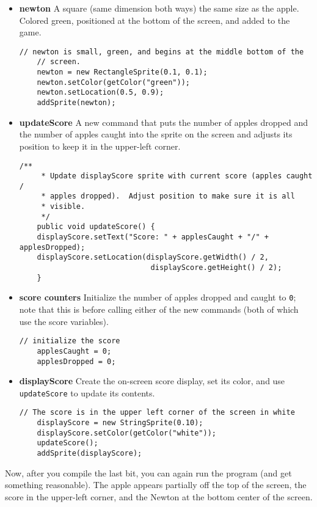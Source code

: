 \documentclass[12pt,twoside]{memoir}
\newcommand\code[1]{\lstinline^#1^}
\newenvironment{LabExercises}{%
\renewcommand{\ExerciseListName}{Question}%
\renewcommand{\ExerciseListHeader}{\textbf{%
   Checkpoint\ExerciseHeaderNB. }}
\begin{ExerciseList}}%
{\end{ExerciseList}}
\begin{document}
\begin{LabExercises}
\begin{itemize}
\item \textbf{newton} A square (same dimension both ways) the same
  size as the apple. Colored green, positioned at the bottom of the
  screen, and added to the game.
\begin{lstlisting}[numbers=none]    
	// newton is small, green, and begins at the middle bottom of the
	// screen.
	newton = new RectangleSprite(0.1, 0.1);
	newton.setColor(getColor("green"));
	newton.setLocation(0.5, 0.9);
	addSprite(newton);
\end{lstlisting}

\item \textbf{updateScore} A new command that puts the number of
  apples dropped and the number of apples caught into the sprite on
  the screen and adjusts its position to keep it in the upper-left corner.
\begin{lstlisting}[numbers=none]    
    /**
     * Update displayScore sprite with current score (apples caught /
     * apples dropped).  Adjust position to make sure it is all
     * visible.
     */
    public void updateScore() {
	displayScore.setText("Score: " + applesCaught + "/" + applesDropped);
	displayScore.setLocation(displayScore.getWidth() / 2, 
				              displayScore.getHeight() / 2);
    }
\end{lstlisting}

\item \textbf{score counters} Initialize the number of apples dropped
  and caught to \code{0}; note that this is before calling either of
  the new commands (both of which use the score variables).
\begin{lstlisting}[numbers=none]    
	// initialize the score
	applesCaught = 0;
	applesDropped = 0;
\end{lstlisting}

\item \textbf{displayScore} Create the on-screen score display,
  set its color, and use \code{updateScore} to update its contents.
\begin{lstlisting}[numbers=none]    
	// The score is in the upper left corner of the screen in white
	displayScore = new StringSprite(0.10);
	displayScore.setColor(getColor("white"));
	updateScore(); 
	addSprite(displayScore);
\end{lstlisting}
\end{itemize}

Now, after you compile the last bit, you can again run the program
(and get something reasonable). The apple appears partially off the
top of the screen, the score in the upper-left corner, and the Newton
at the bottom center of the screen. 


\end{LabExercises}
\end{document}
